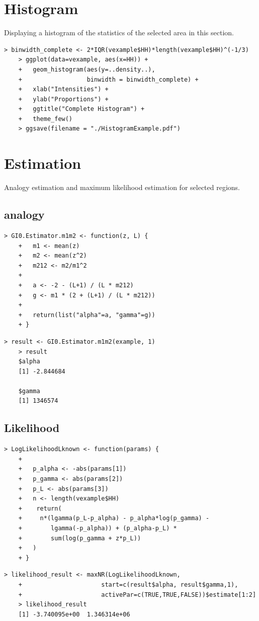 \documentclass{article}
\begin{document}
	\section{Histogram}
	Displaying a histogram of the statistics of the selected area in this section. 
	\begin{lstlisting}[frame=tb]
	> binwidth_complete <- 2*IQR(vexample$HH)*length(vexample$HH)^(-1/3)
	> ggplot(data=vexample, aes(x=HH)) + 
	+   geom_histogram(aes(y=..density..), 
	+                  binwidth = binwidth_complete) + 
	+   xlab("Intensities") +
	+   ylab("Proportions") +
	+   ggtitle("Complete Histogram") +
	+   theme_few()
	> ggsave(filename = "./HistogramExample.pdf")
	\end{lstlisting}
	
	\section{Estimation}
	Analogy estimation and maximum likelihood estimation for selected regions.
	\subsection{analogy}
	\begin{lstlisting}[frame=tb]
	> GI0.Estimator.m1m2 <- function(z, L) {
	+   m1 <- mean(z)
	+   m2 <- mean(z^2)
	+   m212 <- m2/m1^2
	+   
	+   a <- -2 - (L+1) / (L * m212)
	+   g <- m1 * (2 + (L+1) / (L * m212))
	+   
	+   return(list("alpha"=a, "gamma"=g))
	+ }
	\end{lstlisting}
	\begin{lstlisting}[frame=tb]
	> result <- GI0.Estimator.m1m2(example, 1)
	> result
	$alpha
	[1] -2.844684

	$gamma
 	[1] 1346574
	\end{lstlisting}
	\subsection{Likelihood}
	\begin{lstlisting}[frame=tb]
	> LogLikelihoodLknown <- function(params) {
	+   
	+   p_alpha <- -abs(params[1])
	+   p_gamma <- abs(params[2])
	+   p_L <- abs(params[3])
	+   n <- length(vexample$HH)
	+    return(
	+     n*(lgamma(p_L-p_alpha) - p_alpha*log(p_gamma) -
	+        lgamma(-p_alpha)) + (p_alpha-p_L) * 
	+        sum(log(p_gamma + z*p_L)) 
	+   )
	+ }
	\end{lstlisting}
	\begin{lstlisting}[frame=tb]
	> likelihood_result <- maxNR(LogLikelihoodLknown, 
	+                      start=c(result$alpha, result$gamma,1), 
	+                      activePar=c(TRUE,TRUE,FALSE))$estimate[1:2]
	> likelihood_result
	[1] -3.740095e+00  1.346314e+06
	\end{lstlisting}
	
\end{document}

